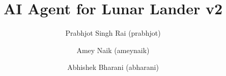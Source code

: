 \documentclass[11pt]{llncs}
\begin{document}
\pagestyle{empty} 
\title{AI Agent for Lunar Lander v2}
\author{Prabhjot Singh Rai (prabhjot)\institute{}
\and
Amey Naik (ameynaik)\institute{}
\and 
Abhishek Bharani (abharani)\institute{}
}

\maketitle






\pagestyle{plain}


\end{document}
